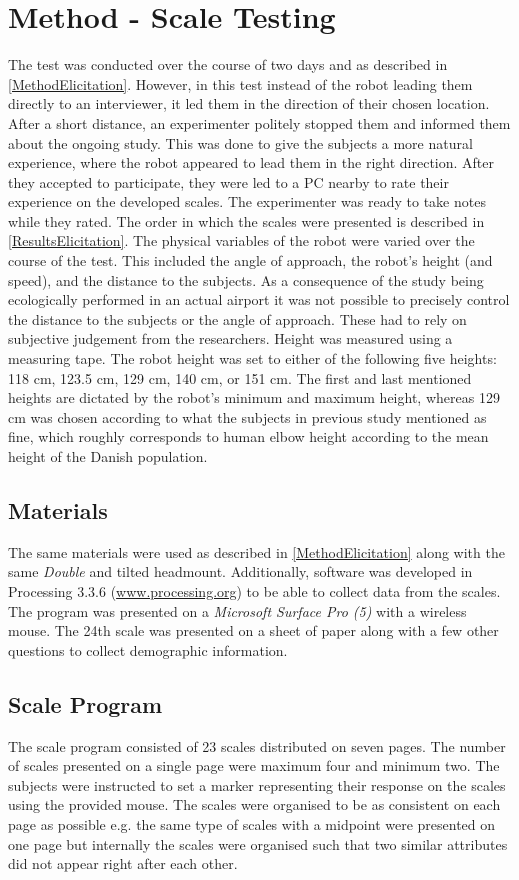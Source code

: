 \section{Method - Scale Testing}
\label{Method2}
The test was conducted over the course of two days and as described in \autoref{MethodElicitation}. However, in this test instead of the robot leading them directly to an interviewer, it led them in the direction of their chosen location. After a short distance, an experimenter politely stopped them and informed them about the ongoing study. This was done to give the subjects a more natural experience, where the robot appeared to lead them in the right direction. After they accepted to participate, they were led to a PC nearby to rate their experience on the developed scales. The experimenter was ready to take notes while they rated. The order in which the scales were presented is described in \autoref{ResultsElicitation}. The physical variables of the robot were varied over the course of the test. This included the angle of approach, the robot's height (and speed), and the distance to the subjects. As a consequence of the study being ecologically performed in an actual airport it was not possible to precisely control the distance to the subjects or the angle of approach. These had to rely on subjective judgement from the researchers. Height was measured using a measuring tape. The robot height was set to either of the following five heights: 118 cm, 123.5 cm, 129 cm, 140 cm, or 151 cm. The first and last mentioned heights are dictated by the robot's minimum and maximum height, whereas 129 cm was chosen according to what the subjects in previous study mentioned as fine, which roughly corresponds to human elbow height according to the mean height of the Danish population. 

\subsection{Materials}
The same materials were used as described in \autoref{MethodElicitation} along with the same \textit{Double} and tilted headmount. Additionally, software was developed in Processing 3.3.6 (\url{www.processing.org}) to be able to collect data from the scales. The program was presented on a \textit{Microsoft Surface Pro (5)} with a wireless mouse. The 24th scale was presented on a sheet of paper along with a few other questions to collect demographic information.

\subsection{Scale Program}
The scale program consisted of 23 scales distributed on seven pages. The number of scales presented on a single page were maximum four and minimum two. The subjects were instructed to set a marker representing their response on the scales using the provided mouse. The scales were organised to be as consistent on each page as possible e.g. the same type of scales with a midpoint were presented on one page but internally the scales were organised such that two similar attributes did not appear right after each other.

